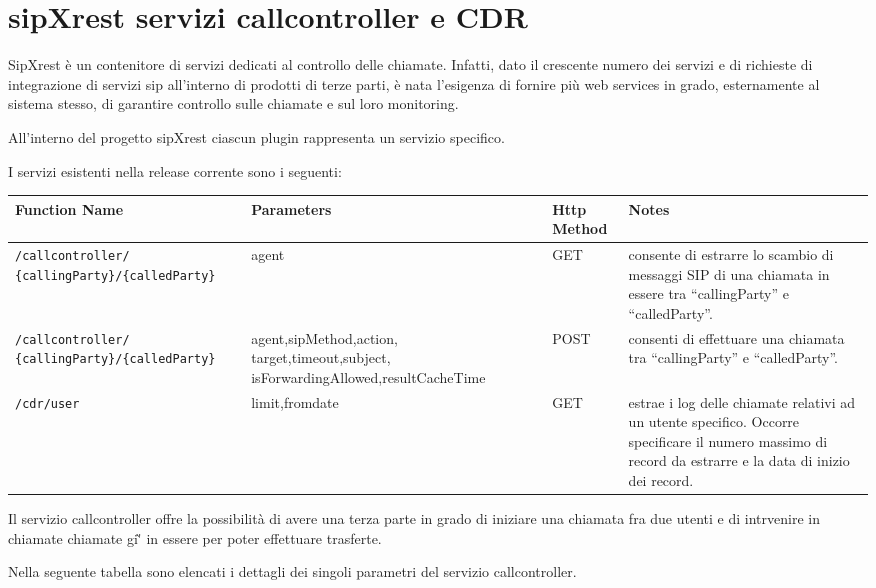 \section{sipXrest servizi callcontroller e CDR }
SipXrest \`e un contenitore di servizi dedicati al controllo delle chiamate. Infatti, dato il crescente numero dei servizi e di richieste di integrazione di servizi sip all'interno di prodotti di terze parti, \`e nata l'esigenza di fornire pi\`u web services in grado, esternamente al sistema stesso, di garantire controllo sulle chiamate e sul loro monitoring.

All'interno del progetto sipXrest ciascun plugin rappresenta un servizio specifico. 

I servizi esistenti nella release corrente sono i seguenti:


\begin{tabular}[c]{p{6cm}| p{4cm} || l || p{5cm}}
Function Name & Parameters & Http Method & Notes \\
\hline \hline
\texttt{/callcontroller/ \{callingParty\}/\{calledParty\}} & agent & GET & consente di estrarre lo scambio di messaggi SIP di una chiamata in essere tra ``callingParty'' e ``calledParty''. \\ \hline
\texttt{/callcontroller/ \{callingParty\}/\{calledParty\}} & agent,sipMethod,action, target,timeout,subject, isForwardingAllowed,resultCacheTime & POST & consenti di effettuare una chiamata tra ``callingParty'' e ``calledParty''. \\ \hline
\texttt{/cdr/{user}} & limit,fromdate & GET & estrae i log delle chiamate relativi ad un utente specifico. Occorre specificare il numero massimo di record da estrarre e la data di inizio dei record. \\ \hline
\end{tabular}

\bigskip

Il servizio callcontroller offre la possibilit\`a di avere una terza parte in grado di iniziare una chiamata fra due utenti e di intrvenire in chiamate chiamate gi\`' in essere per poter effettuare trasferte.

Nella seguente tabella sono elencati i dettagli dei singoli parametri del servizio callcontroller.

\bigskip

